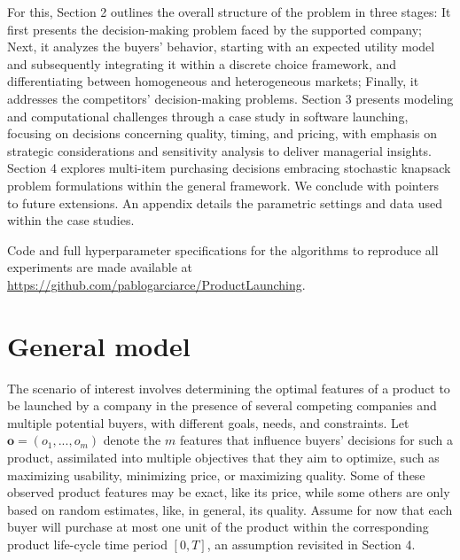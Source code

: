 \documentclass[a4paper,fleqn, 11pt]{cas-sc}
\begin{document}
   For this, Section 2 outlines the overall structure of the problem in three stages: It first presents the decision-making problem faced by the supported company; Next, it analyzes the buyers’ behavior, starting with an expected utility model and subsequently integrating it within a discrete choice framework, and differentiating between homogeneous and heterogeneous markets;  Finally, it addresses the competitors’ decision-making problems.
   Section 3  presents modeling and computational challenges through a case study in software launching, focusing on 
  decisions concerning quality, timing, and pricing, with emphasis on strategic considerations and sensitivity analysis to deliver
     managerial insights. Section 4 explores multi-item purchasing decisions embracing stochastic knapsack problem formulations within the general framework.
 We conclude with pointers to future extensions. An appendix details the parametric settings and data used within the case studies.
 
 Code and full hyperparameter specifications for the algorithms
to reproduce all experiments are made available at \url{https://github.com/pablogarciarce/ProductLaunching}.


\section{General model}\label{general_model}

The scenario of interest involves determining the optimal features of a product to be launched by a company in the presence of several competing companies and multiple potential buyers, with different goals, needs, and constraints. Let ${\bm o}  = (o_1, ..., o_m)$ denote the $m$ features that influence buyers' decisions for such a   product,  assimilated into multiple objectives that they aim to optimize, such as maximizing usability, minimizing price, or maximizing quality. Some of these observed product features may be exact, like its price, while some others are only based on random estimates, like, in general, its quality. 
Assume for now  that each buyer will purchase at most one unit of the product within the corresponding product life-cycle time period $[0,T]$, an assumption revisited in Section 4. %
\end{document}
